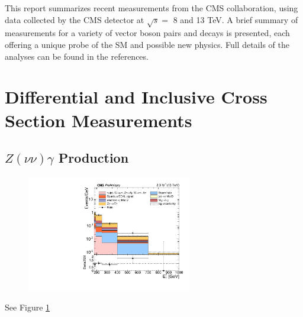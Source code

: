 \documentclass[10pt]{article}
\begin{document}
This report summarizes recent measurements from the CMS collaboration, using
data collected by the CMS detector at $\sqrt{s} =$ 8 and 13 TeV. A brief summary
of measurements for a variety of vector boson pairs and decays is presented, 
each offering a unique probe of the SM and possible new physics. Full details of 
the analyses can be found in the references.


\section{Differential and Inclusive Cross Section Measurements}
\subsection{$Z(\nu\nu)\gamma$ Production}
\begin{figure}[htb]
  \centering
    \includegraphics[height=2in]{figures/MonoPhoto_ETmiss.pdf}
  \caption{ }
  \label{fig:zgamma_etmiss}
\end{figure}
See Figure \ref{fig:zgamma_etmiss}
\cite{CMS-PAS-SMP-16-004}
\end{document}
